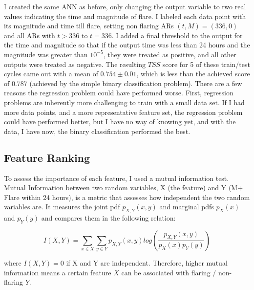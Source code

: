 I created the same ANN as before, only changing the output variable to two real values indicating the time and magnitude of flare. I labeled each data point with its magnitude and time till flare, setting non flaring ARs $(t, M) = (336, 0)$ and all ARs with $t > 336$ to $t = 336$. I added a final threshold to the output for the time and magnitude so that if the output time was less than 24 hours and the magnitude was greater than $10^{-5}$, they were treated as positive, and all other outputs were treated as negative. The resulting $TSS$ score for 5 of these train/test cycles came out with a mean of $0.754 \pm 0.01$, which is less than the achieved score of $0.787$ (achieved by the simple binary classification problem). There are a few reasons the regression problem could have performed worse. First, regression problems are inherently more challenging to train with a small data set. If I had more data points, and a more representative feature set, the regression problem could have performed better, but I have no way of knowing yet, and with the data, I have now, the binary classification performed the best.

\subsection{Feature Ranking}
To assess the importance of each feature, I used a mutual information test. Mutual Information between two random variables, X (the feature) and Y (M+ Flare within 24 hours), is a metric that assesses how independent the two random variables are. It measures the joint pdf $p_{X,Y}(x, y)$ and marginal pdfs $p_X(x)$ and $p_Y(y)$ and compares them in the following relation:

$$I(X, Y) = \sum_{x \in X}\sum_{y \in Y}p_{X,Y}(x, y)log(\frac{p_{X,Y}(x, y)}{p_X(x)p_Y(y)})$$

where $I(X, Y) = 0$ if X and Y are independent. Therefore, higher mutual information means a certain feature $X$ can be associated with flaring / non-flaring $Y$. 

